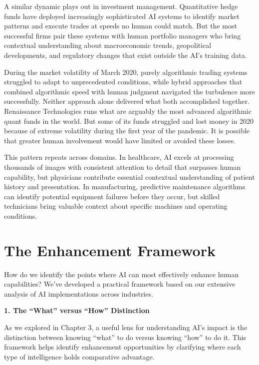 \documentclass[
  Letterpaper,
]{scrbook}
\begin{document}
A similar dynamic plays out in investment management. Quantitative hedge
funds have deployed increasingly sophisticated AI systems to identify
market patterns and execute trades at speeds no human could match. But
the most successful firms pair these systems with human portfolio
managers who bring contextual understanding about macroeconomic trends,
geopolitical developments, and regulatory changes that exist outside the
AI's training data.

During the market volatility of March 2020, purely algorithmic trading
systems struggled to adapt to unprecedented conditions, while hybrid
approaches that combined algorithmic speed with human judgment navigated
the turbulence more successfully. Neither approach alone delivered what
both accomplished together. Renaissance Technologies runs what are
arguably the most advanced algorithmic quant funds in the world. But
some of its funds struggled and lost money in 2020 because of extreme
volatility during the first year of the pandemic. It is possible that
greater human involvement would have limited or avoided these losses.

This pattern repeats across domains. In healthcare, AI excels at
processing thousands of images with consistent attention to detail that
surpasses human capability, but physicians contribute essential
contextual understanding of patient history and presentation. In
manufacturing, predictive maintenance algorithms can identify potential
equipment failures before they occur, but skilled technicians bring
valuable context about specific machines and operating conditions.

\section{The Enhancement Framework}\label{the-enhancement-framework}

How do we identify the points where AI can most effectively enhance
human capabilities? We've developed a practical framework based on our
extensive analysis of AI implementations across industries.

\textbf{1. The ``What'' versus ``How'' Distinction}

As we explored in Chapter 3, a useful lens for understanding AI's impact
is the distinction between knowing ``what'' to do versus knowing ``how''
to do it. This framework helps identify enhancement opportunities by
clarifying where each type of intelligence holds comparative advantage.
\end{document}
